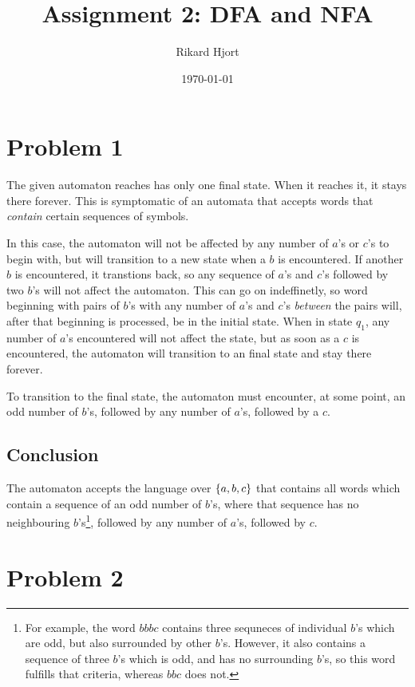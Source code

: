 \documentclass{article}
\title{Assignment 2: DFA and NFA}
\date{\today}
\author{Rikard Hjort}
\begin{document}
\maketitle

\section*{Problem 1}

The given automaton reaches has only one final state. When it reaches it, it stays there forever. This is symptomatic of an automata that accepts words that \textit{contain} certain sequences of symbols.

In this case, the automaton will not be affected by any number of $a$'s or $c$'s to begin with, but will transition to a new state when a $b$ is encountered. If another $b$ is encountered, it transtions back, so any sequence of $a$'s and $c$'s followed by two $b$'s will not affect the automaton. This can go on indeffinetly, so word beginning with pairs of $b$'s with any number of $a$'s and $c$'s \textit{between} the pairs will, after that beginning is processed, be in the initial state. When in state $q_1$, any number of $a$'s encountered will not affect the state, but as soon as a $c$ is encountered, the automaton will transition to an final state and stay there forever.

To transition to the final state, the automaton must encounter, at some point, an odd number of $b$'s, followed by any number of $a$'s, followed by a $c$.

\subsection*{Conclusion}

The automaton accepts the language over $\set{a,b,c}$ that contains all words which contain a sequence of an odd number of $b$'s, where that sequence has no neighbouring $b$'s\footnote{For example, the word $bbbc$ contains three sequneces of individual $b$'s which are odd, but also surrounded by other $b$'s. However, it also contains a sequence of three $b$'s which is odd, and has no surrounding $b$'s, so this word fulfills that criteria, whereas $bbc$ does not.}, followed by any number of $a$'s, followed by $c$.

\newpage
\section*{Problem 2}
\end{document}
